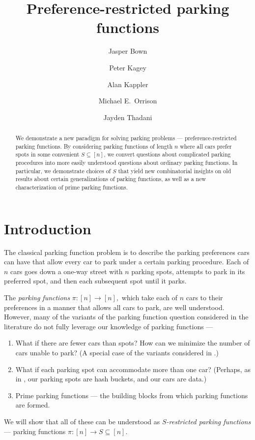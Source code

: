\documentclass[12 pt]{amsart}
\title{Preference-restricted parking functions}
\author[Bown]{Jasper Bown}
\author[Kagey]{Peter Kagey}
\author[Kappler]{Alan Kappler}
\author[Orrison]{Michael E.~Orrison}
\author[Thadani]{Jayden Thadani}
\theoremstyle{definition} %
\theoremstyle{remark} %
\begin{document}
	

\begin{abstract}
	We demonstrate a new paradigm for solving parking problems --- preference-restricted parking functions. By considering parking functions of length $n$ where all cars prefer spots in some convenient $S \subseteq [n]$, we convert questions about complicated parking procedures into more easily understood questions about ordinary parking functions. In particular, we demonstrate choices of $S$ that yield new combinatorial insights on old results about certain generalizations of parking functions, as well as a new characterization of prime parking functions.
\end{abstract}

\maketitle

\pagebreak

\tableofcontents

\pagebreak

\makeatletter
\providecommand\@dotsep{5}
\makeatother
\listoftodos\relax

\pagebreak

\section{Introduction}

The classical parking function problem is to describe the parking preferences cars can have that allow every car to park under a certain parking procedure. Each of $n$ cars goes down a one-way street with $n$ parking spots, attempts to park in its preferred spot, and then each subsequent spot until it parks.

The \emph{parking functions} $\pi : [n] \to [n],$ which take each of $n$ cars to their preferences in a manner that allows all cars to park, are well understood. However, many of the variants of the parking function question considered in the literature do not fully leverage our knowledge of parking functions ---
\begin{enumerate}
	\item What if there are fewer cars than spots? How can we minimize the number of cars unable to park? (A special case of the variants considered in \cite{cameron-johannsen-prellberg-schweitzer-2008}.)
	\item What if each parking spot can accommodate more than one car? (Perhaps, as in \cite{blake-konheim-1977}, our parking spots are hash buckets, and our cars are data.)
	\item Prime parking functions --- the building blocks from which parking functions are formed.
\end{enumerate}
We will show that all of these can be understood as \emph{$S$-restricted parking functions} --- parking functions $\pi : [n] \to S \subseteq [n]$. 
\end{document}
